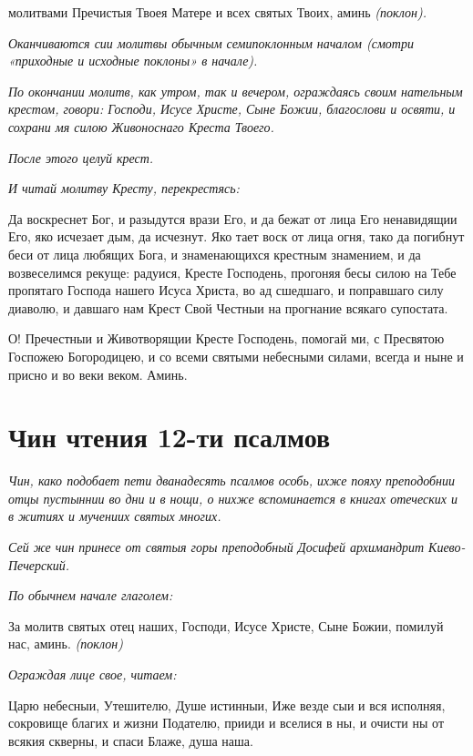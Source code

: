молитвами Пречистыя Твоея Матере и всех святых Твоих, аминь
\itshape (поклон)\normalfont{}.


 \itshape Оканчиваются сии молитвы обычным семипоклонным началом (смотри
«приходные и исходные поклоны» в начале).\normalfont{}


 \itshape По окончании молитв, как утром, так и вечером, ограждаясь своим
нательным крестом, говори:\normalfont{} Господи, Исусе Христе, Сыне Божии, благослови
и освяти, и сохрани мя силою Живоноснаго Креста Твоего.


 \itshape После этого целуй крест.\normalfont{}


 \itshape И читай молитву Кресту, перекрестясь:\normalfont{}


   Да воскреснет Бог, и разыдутся врази Его, и да бежат от лица Его
ненавидящии Его, яко исчезает дым, да исчезнут. Яко тает воск от лица
огня, тако да погибнут беси от лица любящих Бога, и знаменающихся
крестным знамением, и да возвеселимся рекуще: радуися, Кресте Господень,
прогоняя бесы силою на Тебе пропятаго Господа нашего Исуса Христа, во ад
сшедшаго, и поправшаго силу диаволю, и давшаго нам Крест Свой Честныи
на прогнание всякаго супостата.


   О! Пречестныи и Животворящии Кресте Господень, помогай ми, с
Пресвятою Госпожею Богородицею, и со всеми святыми небесными силами,
всегда и ныне и присно и во веки веком. Аминь.

   

\section{Чин чтения 12-ти псалмов}



\itshape Чин, како подобает пети дванадесять псалмов особь, ихже пояху
преподобнии отцы пустыннии во дни и в нощи, о нихже вспоминается в
книгах отеческих и в житиях и мучениих святых многих.\normalfont{}


 \itshape Сей же чин принесе от святыя горы преподобный Досифей архимандрит
Киево-Печерский.\normalfont{}


 \itshape По обычнем начале глаголем:\normalfont{}


   За молитв святых отец наших, Господи, Исусе Христе, Сыне Божии,
помилуй нас, аминь. \itshape (поклон)\normalfont{}


 \itshape Ограждая лице свое, читаем:\normalfont{}


   Царю небесныи, Утешителю, Душе истинныи, Иже везде сыи и вся
исполняя, сокровище благих и жизни Подателю, прииди и вселися в ны, и
очисти ны от всякия скверны, и спаси Блаже, душа наша.


